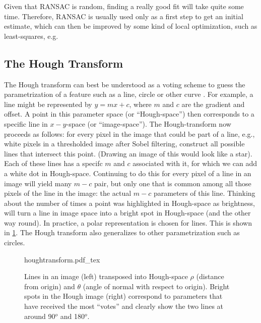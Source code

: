 Given that RANSAC is random, finding a really good fit will take quite some time. Therefore, RANSAC is usually used only as a first step to get an initial estimate, which can then be improved by some kind of local optimization, such as least-squares, e.g.

\subsection{The Hough Transform}
The Hough transform  can best be understood as a voting scheme to guess the parametrization of a feature such as a line, circle or other curve \cite{duda1972use}. For example, a line might be represented by $y=mx+c$, where $m$ and $c$ are the gradient and offset. A point in this parameter space (or ``Hough-space'') then corresponds to a specific line in $x-y$-space (or ``image-space''). The Hough-transform now proceeds as follows: for every pixel in the image that could be part of a line, e.g., white pixels in a thresholded image after Sobel filtering, construct all possible lines that intersect this point. (Drawing an image of this would look like a star). Each of these lines has a specifc $m$ and $c$ associated with it, for which we can add a white dot in Hough-space. Continuing to do this for every pixel of a line in an image will yield many $m-c$ pair, but only one that is common among all those pixels of the line in the image: the actual $m-c$ parameters of this line. Thinking about the number of times a point was highlighted in Hough-space as brightness, will turn a line in image space into a bright spot in Hough-space (and the other way round). In practice, a polar representation is chosen for lines. This is shown in \cref{fig:hough}. The Hough transform also generalizes to other parametrization such as circles.

\begin{figure}
    \center
    \def\svgwidth{\textwidth}
    {houghtransform.pdf_tex}
    \caption{Lines in an image (left) transposed into Hough-space $\rho$ (distance from origin) and $\theta$ (angle of normal with respect to origin). Bright spots in the Hough image (right) correspond to parameters that have received the most ``votes'' and clearly show the two lines at around 90$^o$ and 180$^o$.\label{fig:hough}}
\end{figure}


